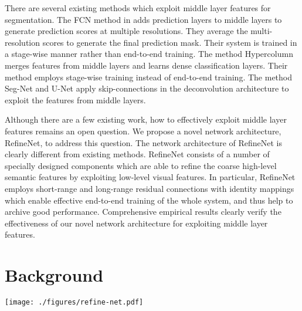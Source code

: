 \documentclass[10pt,twocolumn,letterpaper]{article}
\newcommand{\Sec}{Sec.\xspace}
\newcommand{\ep}[1]{\emph{(#1)}}
\begin{document}
There are several existing methods which exploit middle layer features for segmentation. The FCN method in \cite{LongSD14} adds prediction layers to middle layers to generate prediction scores at multiple resolutions. They average the multi-resolution scores to generate the final prediction mask. Their system is trained in a stage-wise manner rather than end-to-end training. The method Hypercolumn \cite{hariharan2014hypercolumns} merges features from middle layers and learns dense classification layers. Their method employs stage-wise training instead of end-to-end training. The method Seg-Net \cite{BadrinarayananK15} and U-Net \cite{Ronneberger2015} apply skip-connections in the deconvolution architecture to exploit the features from middle layers. 


Although there are a few existing work, how to effectively exploit middle layer features remains an open question.
We propose a novel network architecture, RefineNet, to address this question.
The network architecture of RefineNet is clearly different from existing methods.
RefineNet consists of a number of specially designed components which are able to refine the coarse high-level semantic features by exploiting low-level visual features.
In particular, RefineNet employs short-range and long-range residual connections with identity mappings 
which enable effective end-to-end training of the whole system, and thus help to archive good performance. 
Comprehensive empirical results clearly verify the effectiveness of our novel network architecture for exploiting middle layer features.


\section{Background}\label{sec:background}\begin{figure*}[t]
	\centering	
	\texttt{[image: ./figures/refine-net.pdf]}	
\caption{Comparison of fully convolutional approaches for dense classification. 
Standard multi-layer CNNs, such as ResNet \ep{a} suffer from downscaling of the feature maps, thereby losing fine structures along the way. 
Dilated convolutions \ep{b} remedy this shortcoming by introducing atrous filters, but are computationally expensive to train and quickly reach memory limits even on modern GPUs.
Our proposed architecture that we call RefineNet \ep{c} exploits various levels of detail at different stages of convolutions and fuses them to obtain a high-resolution prediction without the need to maintain large intermediate feature maps. The details of the RefineNet block are outlined in \Sec~\ref{sec:refine-net} and illustrated in Fig~\ref{fig:refine-net-detailed-joint}.}
\label{fig:refine-net}
\end{figure*}
\end{document}
